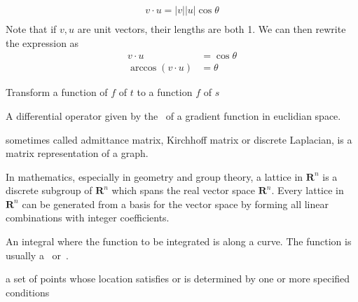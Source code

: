\begin{definition}
    \begin{align*}
        v \cdot u = |v||u|\cos{\theta} \\
    \end{align*}
    Note that if $v, u$ are unit vectors, their lengths are both 1.
    We can then rewrite the expression as
    \begin{align*}
        v \cdot u &= \cos{\theta} \\
        \arccos{(v \cdot u)} &= \theta
    \end{align*}
\end{definition}

\begin{definition}
    Transform a function of $f$ of $t$ to a function $f$ of $s$

    A differential operator given by the~ of a gradient 
    function in euclidian space.
\end{definition}

\begin{definition}
    sometimes called admittance matrix, Kirchhoff matrix or discrete Laplacian,
    is a matrix representation of a graph.

\end{definition}

\begin{definition}[Lattice]
    In mathematics, especially in geometry and group theory, a lattice in
    $\mathbf{R}^n$ is a discrete subgroup of $\mathbf{R}^n$ which spans the real
    vector space $\mathbf{R}^n$. Every lattice in $\mathbf{R}^n$ can be generated
    from a basis for the vector space by forming all linear combinations with
    integer coefficients. 

\end{definition}

\begin{definition}
    An integral where the function to be integrated is along a curve.
    The function is usually a~ or~.

\end{definition}

\begin{definition}[Locus]
    a set of points whose location satisfies or is determined by one or more
    specified conditions

\end{definition}

